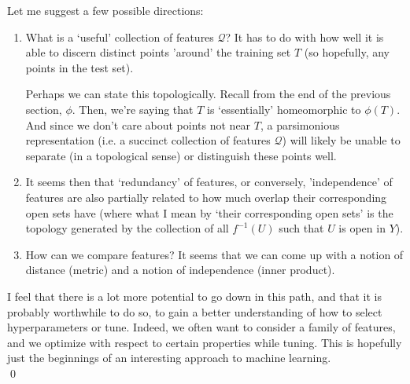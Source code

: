 \documentclass[10]{article}
\theoremstyle{plain}
\begin{document}
Let me suggest a few possible directions:
\begin{enumerate}
    \item What is a `useful' collection of features $\mathcal{Q}$? It has to do with how well it is able to discern distinct points 'around' the training set $T$ (so hopefully, any points in the test set).
    
    Perhaps we can state this topologically. Recall from the end of the previous section, $\phi$. Then, we're saying that $T$ is `essentially' homeomorphic to $\phi(T)$. And since we don't care about points not near $T$, a parsimonious representation (i.e. a succinct collection of features $\mathcal{Q}$) will likely be unable to separate (in a topological sense) or distinguish these points well.
    
    \item It seems then that `redundancy' of features, or conversely, 'independence' of features are also partially related to how much overlap their corresponding open sets have (where what I mean by `their corresponding open sets' is the topology generated by the collection of all $f^{-1}(U)$ such that $U$ is open in $Y$).
    
    \item How can we compare features? It seems that we can come up with a notion of distance (metric) and a notion of independence (inner product).
\end{enumerate}
I feel that there is a lot more potential to go down in this path, and that it is probably worthwhile to do so, to gain a better understanding of how to select hyperparameters or tune. Indeed, we often want to consider a family of features, and we optimize with respect to certain properties while tuning. This is hopefully just the beginnings of an interesting approach to machine learning.\\

\vspace{1em}\qed
\end{document}
